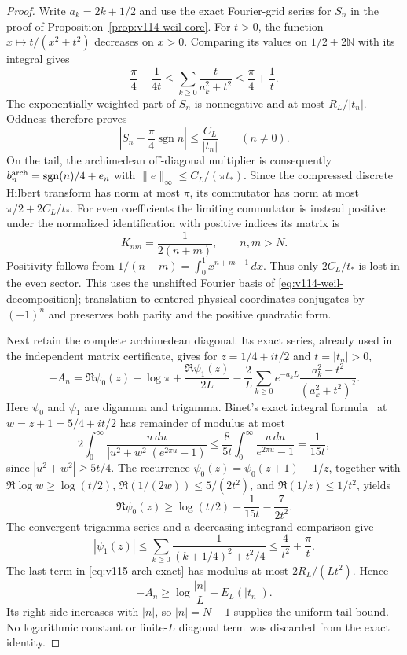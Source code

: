 \begin{proof}
Write $a_k=2k+1/2$ and use the exact Fourier-grid series for $S_n$
in the proof of Proposition~\ref{prop:v114-weil-core}.
For $t>0$, the function $x\mapsto t/(x^2+t^2)$ decreases on $x>0$.
Comparing its values on $1/2+2\mathbb N$ with its integral gives
\[
 \frac\pi4-\frac1{4t}
 \le\sum_{k\ge0}\frac{t}{a_k^2+t^2}
 \le\frac\pi4+\frac1t.
\]
The exponentially weighted part of $S_n$ is nonnegative and at most
$R_L/|t_n|$. Oddness therefore proves
\begin{equation}\label{eq:v115-S-sharp}
 \left|S_n-\frac\pi4\operatorname{sgn}n\right|
       \le\frac{C_L}{|t_n|}\qquad(n\ne0).
\end{equation}
On the tail, the archimedean off-diagonal multiplier is consequently
$b_n^{\rm arch}=\operatorname{sgn}(n)/4+e_n$ with
$\|e\|_\infty\le C_L/(\pi t_*)$.
Since the compressed discrete Hilbert transform has norm at most $\pi$,
its commutator has norm at most $\pi/2+2C_L/t_*$.
For even coefficients the limiting commutator is instead positive:
under the normalized identification with positive indices its matrix is
\[
 K_{nm}=\frac1{2(n+m)},\qquad n,m>N.
\]
Positivity follows from
$1/(n+m)=\int_0^1x^{n+m-1}\,dx$. Thus only $2C_L/t_*$ is lost in
the even sector. This uses the unshifted Fourier basis of
\eqref{eq:v114-weil-decomposition}; translation to centered physical
coordinates conjugates by $(-1)^n$ and preserves both parity and the
positive quadratic form.

Next retain the complete archimedean diagonal. Its exact series, already
used in the independent matrix certificate, gives for
$z=1/4+it/2$ and $t=|t_n|>0$,
\begin{equation}\label{eq:v115-arch-exact}
 -A_n=\Re\psi_0(z)-\log\pi+\frac{\Re\psi_1(z)}{2L}
 -\frac2L\sum_{k\ge0}e^{-a_kL}
                   \frac{a_k^2-t^2}{(a_k^2+t^2)^2}.
\end{equation}
Here $\psi_0$ and $\psi_1$ are digamma and trigamma.
Binet's exact integral formula~\cite[eq.~5.9.15]{NISTDigamma} at
$w=z+1=5/4+it/2$ has remainder of modulus at most
\[
 2\int_0^\infty\frac{u\,du}
 {|u^2+w^2|(e^{2\pi u}-1)}
 \le\frac8{5t}\int_0^\infty\frac{u\,du}{e^{2\pi u}-1}
 =\frac1{15t},
\]
since $|u^2+w^2|\ge5t/4$. The recurrence
$\psi_0(z)=\psi_0(z+1)-1/z$, together with
$\Re\log w\ge\log(t/2)$,
$\Re(1/(2w))\le5/(2t^2)$, and $\Re(1/z)\le1/t^2$, yields
\[
 \Re\psi_0(z)\ge\log(t/2)-\frac1{15t}-\frac7{2t^2}.
\]
The convergent trigamma series and a decreasing-integrand comparison give
\[
 |\psi_1(z)|\le\sum_{k\ge0}\frac1{(k+1/4)^2+t^2/4}
                 \le\frac4{t^2}+\frac\pi t.
\]
The last term in \eqref{eq:v115-arch-exact} has modulus at most
$2R_L/(Lt^2)$. Hence
\begin{equation}\label{eq:v115-diagonal-sharp}
 -A_n\ge\log\frac{|n|}{L}-E_L(|t_n|).
\end{equation}
Its right side increases with $|n|$, so $|n|=N+1$ supplies the uniform
tail bound. No logarithmic constant or finite-$L$ diagonal term was
discarded from the exact identity.


\end{proof}
